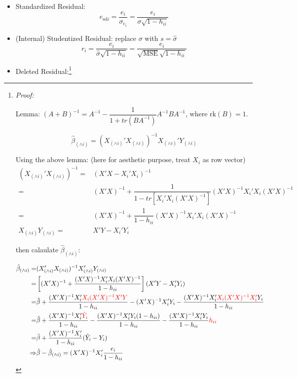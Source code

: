 \begin{itemize}[topsep=2pt,itemsep=2pt]
    \item Standardized Residual:
    \begin{equation}
         e_{\mathrm{sd}i}=\dfrac{e_i}{\sigma _{e_i}}=\dfrac{e_i}{\sigma \sqrt{1-h_{ii}}}
    \end{equation}
    \item (Internal) Studentized Residual: replace $ \sigma  $ with $ s=\hat{\sigma } $
    \begin{equation}\label{EqaInternalStudentizedResidual}
         r_i=\dfrac{e_i}{\hat{\sigma }\sqrt{1-h_{ii}}}=\dfrac{e_i}{\sqrt{\mathrm{MSE} }\sqrt{1-h_{ii}}}
    \end{equation}
    
    \item Deleted Residual:\footnote{
        \textit{Proof:}

        Lemma: $ (A+B)^{-1}=A^{-1}-\dfrac{1}{1+tr(BA^{-1})}A^{-1}BA^{-1} $, where $ \mathrm{rk}(B)=1  $.

        

        \[
            \hat{\beta }_{(\wedge i)}=(X_{(\wedge i)}'X_{(\wedge i)})^{-1}X_{(\wedge i)}'Y_{(\wedge i)} 
        \]
        
        Using the above lemma: (here for aesthetic purpose, treat $ X_i $ as row vector)
        \begin{align*}
            (X_{(\wedge i)}'X_{(\wedge i)})^{-1}=&(X'X-X_i'X_i)^{-1}\\
            =&(X'X)^{-1}+\dfrac{1}{1-tr[X_i'X_i(X'X)^{-1}]}(X'X)^{-1}X_i'X_i(X'X)^{-1}\\
            =&(X'X)^{-1}+\dfrac{1}{1-h_{ii}}(X'X)^{-1}X_i'X_i(X'X)^{-1}\\
            X_{(\wedge i)}Y_{(\wedge i)}=&X'Y-X_i'Y_i
        \end{align*}

        then calaulate $ \hat{\beta }_{(\wedge i)} $:
   

        \begin{align}\label{EqaProofOfDeleteedResidual}
            \hat{\beta }_{(\wedge i)}=&(X_{(\wedge i)}'X_{(\wedge i)})^{-1}X_{(\wedge i)}'Y_{(\wedge i)}\notag \\
            =&\left[(X'X)^{-1}+\dfrac{(X'X)^{-1}X_i'X_i(X'X)^{-1}}{1-h_{ii}}\right]\left(X'Y-X_i'Y_i\right)\notag\\
            =&\hat{\beta }+\dfrac{(X'X)^{-1}X_i'{\color{red}X_i(X'X)^{-1}X'Y}}{1-h_{ii}}-(X'X)^{-1}X_i'Y_i-\dfrac{(X'X)^{-1}X_i'{\color{red}X_i(X'X)^{-1}X_i'}Y_i}{1-h_{ii}}\notag\\
            =&\hat{\beta }+\dfrac{(X'X)^{-1}X_i'{\color{red}\hat{Y}_i}}{1-h_{ii}}-\dfrac{(X'X)^{-1}X_i'Y_i(1-h_{ii})}{1-h_{ii}}-\dfrac{(X'X)^{-1}X_i'Y_i}{1-h_{ii}}{\color{red}h_{ii}}\notag\\
            =&\hat{\beta }+\dfrac{(X'X)^{-1}X_i'}{1-h_{ii}}(\hat{Y}_i-Y_i)\notag\\
            \Rightarrow &\hat{\beta }-\hat{\beta }_{(\wedge i)}=(X'X)^{-1}X_i'\dfrac{e_i}{1-h_{ii}}
        \end{align}
                    

}
\end{itemize}
